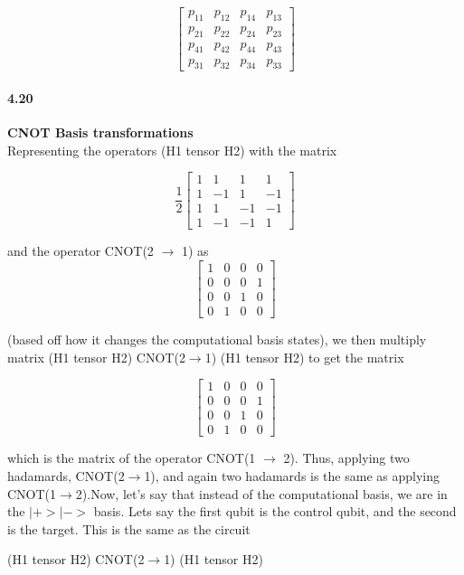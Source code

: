 $$\begin{bmatrix}p_{11} & p_{12} & p_{14} & p_{13} \\
p_{21} & p_{22} & p_{24} & p_{23} \\
p_{41} & p_{42} & p_{44} & p_{43} \\
p_{31} & p_{32} & p_{34} & p_{33}\end{bmatrix}$$

\paragraph{4.20} \textbf{CNOT Basis transformations}
\\

Representing the operators (H1 tensor H2) with the matrix


$$\frac{1}{2}\begin{bmatrix}1 & 1 & 1 & 1 \\
1 & -1 & 1 & -1 \\
1 & 1 & -1 & -1 \\
1 & -1 & -1 & 1\end{bmatrix}$$


and the operator CNOT(2 $\rightarrow$ 1) as 
$$\begin{bmatrix}1 & 0 & 0 & 0\\
0 & 0 & 0 & 1 \\
0 & 0 & 1 & 0 \\
0 & 1 & 0 & 0\end{bmatrix}$$


(based off how it changes the computational basis states), we then multiply matrix (H1 tensor H2) CNOT(2$\rightarrow$1) (H1 tensor H2) to get the matrix 


$$\begin{bmatrix}1 & 0 & 0 & 0\\
0 & 0 & 0 & 1 \\
0 & 0 & 1 & 0 \\
0 & 1 & 0 & 0\end{bmatrix}$$


which is the matrix of the operator CNOT(1 $\rightarrow$ 2). Thus, applying two hadamards, CNOT(2$\rightarrow$1), and again two hadamards is the same as applying CNOT(1$\rightarrow$2).Now, let's say that instead of the computational basis, we are in the $|+>|->$ basis. Lets say the first qubit is the control qubit, and the second is the target. This is the same as the circuit 


(H1 tensor H2) CNOT(2$\rightarrow$1) (H1 tensor H2) 


